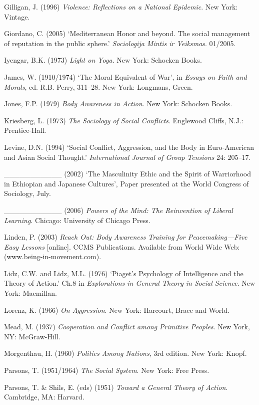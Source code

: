 \begin{list}{}{}
\item Gilligan, J. (1996) \emph{Violence: Reflections on a National Epidemic}. New York: Vintage.
\item Giordano, C. (2005) `Mediterranean Honor and beyond. The social management of reputation in the public sphere.' \emph{Sociologija Mintis ir Veiksmas}. 01/2005.
\item Iyengar, B.K. (1973) \emph{Light on Yoga}. New York: Schocken Books.
\item James, W. (1910/1974) `The Moral Equivalent of War', in \emph{Essays on Faith and Morals}, ed. R.B. Perry, 311--28. New York: Longmans, Green.
\item Jones, F.P. (1979) \emph{Body Awareness in Action}. New York: Schocken Books.
\item Kriesberg, L. (1973) \emph{The Sociology of Social Conflicts}. Englewood Cliffs, N.J.: Prentice-Hall.
\item Levine, D.N. (1994) `Social Conflict, Aggression, and the Body in Euro-American and Asian Social Thought.' \emph{International Journal of Group Tensions} 24: 205--17.
\item \_\_\_\_\_\_\_\_\_\_\_ (2002) `The Masculinity Ethic and the Spirit of Warriorhood in Ethiopian and Japanese Cultures', Paper presented at the World Congress of Sociology, July.
\item \_\_\_\_\_\_\_\_\_\_\_ (2006) \emph{Powers of the Mind: The Reinvention of Liberal Learning}. Chicago: University of Chicago Press.
\item Linden, P. (2003) \emph{Reach Out: Body Awareness Training for Peacemaking---Five Easy Lessons} [online]. CCMS Publications. Available from World Wide Web: (www.being-in-movement.com).
\item Lidz, C.W. and Lidz, M.L. (1976) `Piaget's Psychology of Intelligence and the Theory of Action.' Ch.8 in \emph{Explorations in General Theory in Social Science}. New York: Macmillan.
\item Lorenz, K. (1966) \emph{On Aggression}. New York: Harcourt, Brace and World.
\item Mead, M. (1937) \emph{Cooperation and Conflict among Primitive Peoples}. New York, NY: McGraw-Hill.
\item Morgenthau, H. (1960) \emph{Politics Among Nations}, 3rd edition. New York: Knopf.
\item Parsons, T. (1951/1964) \emph{The Social System}. New York: Free Press.
\item Parsons, T. \& Shils, E. (eds) (1951) \emph{Toward a General Theory of Action}. Cambridge, MA: Harvard.

\end{list}
